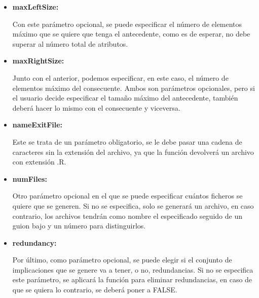 \begin{itemize}
        Cabe especificar, que tanto este par\'ametro, como el anterior, se tratan de tama\~nos m\'aximos, es decir, que no todas las implicaciones 
        van a tener la diferencia exacta que se le especifique entre antecedente y consecuente, sino que el n\'umero o porcentaje ser\'a la 
        mayor diferencia que se encontrar\'a en el sistema de implicaciones.


        \item \textbf{maxLeftSize:}

        Con este par\'ametro opcional, se puede especificar el n\'umero de elementos m\'aximo que se quiere que tenga el antecedente, como 
        es de esperar, no debe superar al n\'umero total de atributos.


        \item \textbf{maxRightSize:}

        Junto con el anterior, podemos especificar, en este caso, el n\'umero de elementos m\'aximo del consecuente. Ambos son par\'ametros 
        opcionales, pero si el usuario decide especificar el tama\~no m\'aximo del antecedente, tambi\'en deber\'a hacer lo mismo con el 
        consecuente y viceversa.


        \item \textbf{nameExitFile:}

        Este se trata de un par\'ametro obligatorio, se le debe pasar una cadena de caracteres sin la extensi\'on del archivo, ya que 
        la funci\'on devolver\'a un archivo con extensi\'on .R.


        \item \textbf{numFiles:}

        Otro par\'ametro opcional en el que se puede especificar cu\'antos ficheros se quiere que se generen. Si no se especifica, 
        solo se generar\'a un archivo, en caso contrario, los archivos tendr\'an como nombre el especificado seguido de un guion bajo y un n\'umero 
        para distinguirlos.

        \item \textbf{redundancy:}

        Por \'ultimo, como par\'ametro opcional, se puede elegir si el conjunto de implicaciones que se genere va a tener, o no, redundancias. Si 
        no se especifica este par\'ametro, se aplicar\'a la funci\'on para eliminar redundancias, en caso de que se quiera lo contrario, se 
        deberá poner a FALSE.

    \end{itemize}


